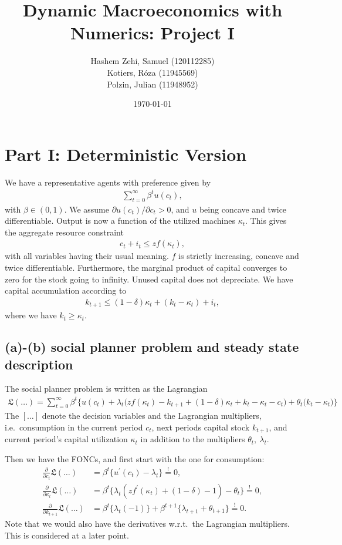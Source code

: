 \documentclass[a4paper]{article}
\title{Dynamic Macroeconomics with Numerics: Project I}
\author{Hashem Zehi, Samuel (120112285)\\Kotiers, Róza (11945569)\\Polzin, Julian (11948952)}
\date{\today}
\theoremstyle{definition}
\begin{document}
\maketitle
\newpage
\section{Part I: Deterministic Version}
We have a representative agents with preference given by
	\begin{align*}
	\sum\limits_{t=0}^{\infty} \beta^t u(c_t),
	\end{align*}
with $\beta \in (0,1)$. We assume $\partial u(c_t)/\partial c_t > 0$, and $u$ being concave and twice differentiable. Output is now a function of the utilized machines $\kappa_t$. This gives the aggregate resource constraint
	\begin{align*}
	c_t + i_t \leq z f(\kappa_t),
	\end{align*}	
with all variables having their usual meaning. $f$ is strictly increasing, concave and twice differentiable. Furthermore, the marginal product of capital converges to zero for the stock going to infinity. Unused capital does not depreciate. We have capital accumulation according to 
	\begin{align*}
	k_{t+1} \leq (1-\delta)\kappa_t + (k_t - \kappa_t)+i_t,
	\end{align*}	
where we have $k_t \geq \kappa_t$. 
\subsection{(a)-(b) social planner problem and steady state description}
The social planner problem is written as the Lagrangian
	\begin{align*}
	\mathfrak L(\dots) = \sum\limits_{t=0}^{\infty} \beta^t \Bigg\{ u(c_t) + \lambda_t \Big(z f(\kappa_t)- k_{t+1}
+(1-\delta)\kappa_t+k_t - \kappa_t -c_t \Big)+ \theta_t \Big( k_t - \kappa_t \Big) \Bigg\}
	\end{align*}
The $[\dots]$ denote the decision variables and the Lagrangian multipliers, i.e.\ consumption in the current period $c_t$, next periods capital stock $k_{t+1}$, and current period's capital utilization $\kappa_t$ in addition to the multipliers $\theta_t,\ \lambda_t$. 
	
Then we have the FONCs, and first start with the one for consumption:
	\begin{align}
	\frac{\partial}{\partial c_t}\mathfrak L(\dots) 			&= \beta^t \Big\{ u^\prime(c_t)-\lambda_t \Big\} \overset{!}{=}0, \\
	\frac{\partial}{\partial \kappa_t}\mathfrak L(\dots)		&= \beta^t \Big\{ \lambda_t( z f^\prime(\kappa_t)+(1-\delta)-1)-\theta_t \Big\} \overset{!}{=} 0, \\
	\frac{\partial}{\partial k_{t+1}}\mathfrak L(\dots)		&= \beta^t \Big\{ \lambda_t(-1) \Big\} + \beta^{t+1} \Big\{ \lambda_{t+1}+\theta_{t+1} \Big\} \overset{!}{=}0. 
	\end{align}
Note that we would also have the derivatives w.r.t.\ the Lagrangian multipliers. This is considered at a later point.	
	
\end{document}
